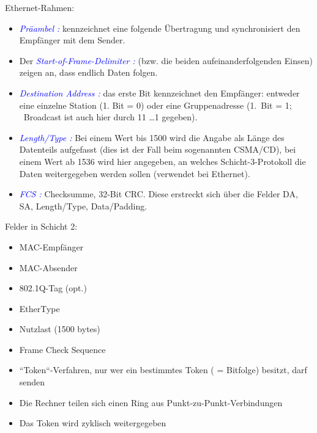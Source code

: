 Ethernet-Rahmen:
\begin{itemize}
    \item \textcolor{blue}{\textit{Präambel :}} kennzeichnet eine folgende Übertragung und synchronisiert den Empfänger mit dem Sender.
    \item Der \textcolor{blue}{\textit{Start-of-Frame-Delimiter :}} (bzw. die beiden aufeinanderfolgenden Einsen) zeigen an, dass endlich Daten folgen.
    \item \textcolor{blue}{\textit{Destination Address :}} das erste Bit kennzeichnet den Empfänger: entweder eine einzelne Station (1. Bit = 0) oder eine Gruppenadresse (1.\ Bit = 1; \ Broadcast ist auch hier durch 11 \ldots 1 gegeben).
    \item \textcolor{blue}{\textit{Length/Type :}} Bei einem Wert bis 1500 wird die Angabe als Länge des Datenteils aufgefasst (dies ist der Fall beim sogenannten CSMA/CD), bei einem Wert ab 1536 wird hier angegeben, an welches Schicht-3-Protokoll die Daten weitergegeben werden sollen (verwendet bei Ethernet).
    \item \textcolor{blue}{\textit{FCS :}} Checksumme, 32-Bit CRC. Diese erstreckt sich über die Felder DA, SA, Length/Type, Data/Padding.
\end{itemize}
Felder in Schicht 2:
\begin{itemize}
    \item MAC-Empfänger
    \item MAC-Absender
    \item 802.1Q-Tag (opt.)
    \item EtherType
    \item Nutzlast (1500 bytes)
    \item Frame Check Sequence
\end{itemize}

\begin{itemize}
    \item “Token“-Verfahren, nur wer ein bestimmtes Token ( = Bitfolge) besitzt, darf senden
    \item Die Rechner teilen sich einen Ring aus Punkt-zu-Punkt-Verbindungen
    \item Das Token wird zyklisch weitergegeben
\end{itemize}

